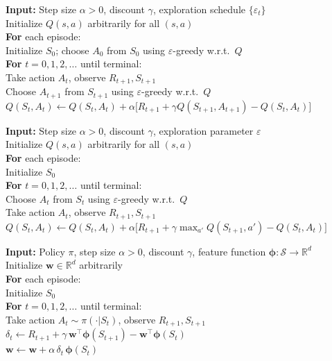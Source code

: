 \documentclass[11pt,a4paper]{article}
\theoremstyle{definition}
\theoremstyle{plain}
\theoremstyle{remark}
\newcommand{\R}{\mathbb{R}}
\begin{document}
\begin{tcolorbox}[colback=white, colframe=black!70, title={\textbf{Algorithm 3:} SARSA --- On-Policy TD Control}, breakable]
\label{alg:sarsa}
\textbf{Input:} Step size $\alpha > 0$, discount $\gamma$, exploration schedule $\{\varepsilon_t\}$\\[2pt]
Initialize $Q(s,a)$ arbitrarily for all $(s,a)$\\
\textbf{For} each episode:\\
\quad Initialize $S_0$; choose $A_0$ from $S_0$ using $\varepsilon$-greedy w.r.t.\ $Q$\\
\quad \textbf{For} $t = 0, 1, 2, \ldots$ until terminal:\\
\quad\quad Take action $A_t$, observe $R_{t+1}, S_{t+1}$\\
\quad\quad Choose $A_{t+1}$ from $S_{t+1}$ using $\varepsilon$-greedy w.r.t.\ $Q$\\
\quad\quad $Q(S_t, A_t) \leftarrow Q(S_t, A_t) + \alpha\bigl[R_{t+1} + \gamma Q(S_{t+1}, A_{t+1}) - Q(S_t, A_t)\bigr]$
\end{tcolorbox}

\begin{tcolorbox}[colback=white, colframe=black!70, title={\textbf{Algorithm 4:} Q-Learning --- Off-Policy TD Control}, breakable]
\label{alg:qlearning}
\textbf{Input:} Step size $\alpha > 0$, discount $\gamma$, exploration parameter $\varepsilon$\\[2pt]
Initialize $Q(s,a)$ arbitrarily for all $(s,a)$\\
\textbf{For} each episode:\\
\quad Initialize $S_0$\\
\quad \textbf{For} $t = 0, 1, 2, \ldots$ until terminal:\\
\quad\quad Choose $A_t$ from $S_t$ using $\varepsilon$-greedy w.r.t.\ $Q$\\
\quad\quad Take action $A_t$, observe $R_{t+1}, S_{t+1}$\\
\quad\quad $Q(S_t, A_t) \leftarrow Q(S_t, A_t) + \alpha\bigl[R_{t+1} + \gamma \max_{a'} Q(S_{t+1}, a') - Q(S_t, A_t)\bigr]$
\end{tcolorbox}

\begin{tcolorbox}[colback=white, colframe=black!70, title={\textbf{Algorithm 5:} Semi-Gradient TD(0) with Linear Function Approximation}, breakable]
\label{alg:semi_grad_td}
\textbf{Input:} Policy $\pi$, step size $\alpha > 0$, discount $\gamma$, feature function $\bm{\phi}: \mathcal{S} \to \R^d$\\[2pt]
Initialize $\bm{w} \in \R^d$ arbitrarily\\
\textbf{For} each episode:\\
\quad Initialize $S_0$\\
\quad \textbf{For} $t = 0, 1, 2, \ldots$ until terminal:\\
\quad\quad Take action $A_t \sim \pi(\cdot|S_t)$, observe $R_{t+1}, S_{t+1}$\\
\quad\quad $\delta_t \leftarrow R_{t+1} + \gamma\,\bm{w}^\top\bm{\phi}(S_{t+1}) - \bm{w}^\top\bm{\phi}(S_t)$\\
\quad\quad $\bm{w} \leftarrow \bm{w} + \alpha\,\delta_t\,\bm{\phi}(S_t)$
\end{tcolorbox}
\end{document}
